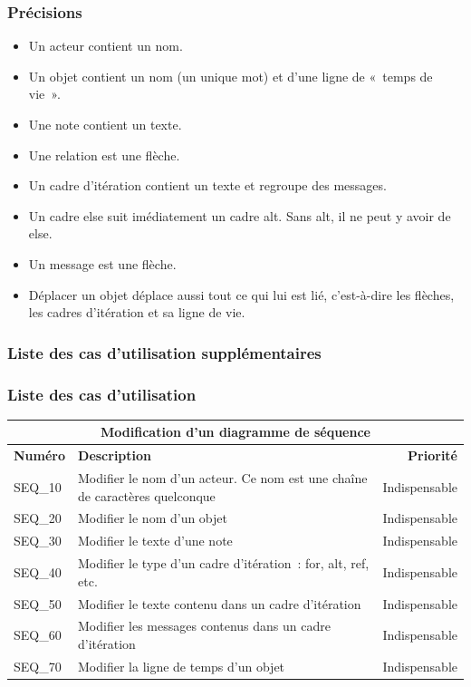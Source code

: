 \documentclass[hidelinks, 10pt,a4paper]{article}
\begin{document}
\subsubsection{Précisions}
\begin{itemize}
 \item Un acteur contient un nom.
 \item Un objet contient un nom (un unique mot) et d’une ligne de «~temps de vie~».
 \item Une note contient un texte.
 \item Une relation est une flèche.
 \item Un cadre d’itération contient un texte et regroupe des messages.
 \item Un cadre else suit imédiatement un cadre alt. Sans alt, il ne peut y avoir de else.
 \item Un message est une flèche.
 \item Déplacer un objet déplace aussi tout ce qui lui est lié, c’est-à-dire les flèches, les cadres d’itération et sa ligne de vie.
\end{itemize}

\subsubsection{Liste des cas d’utilisation supplémentaires}
\subsubsection{Liste des cas d’utilisation}
\begin{center}
    \begin{tabular}{|l|p{8cm}|r|}
        \hline\multicolumn{3}{|c|}{Modification d’un diagramme de séquence} \\\hline
        {\textbf{Numéro}} & {\textbf{Description}} & {\textbf{Priorité}}\\\hline
        {SEQ\_10} & {Modifier le nom d’un acteur. Ce nom est une chaîne de caractères quelconque} & {Indispensable}\\\hline
        {SEQ\_20} & {Modifier le nom d’un objet} & {Indispensable}\\\hline
        {SEQ\_30} & {Modifier le texte d’une note} & {Indispensable}\\\hline
        {SEQ\_40} & {Modifier le type d’un cadre d’itération~: for, alt, ref, etc.} & {Indispensable}\\\hline
        {SEQ\_50} & {Modifier le texte contenu dans un cadre d’itération} & {Indispensable}\\\hline
        {SEQ\_60} & {Modifier les messages contenus dans un cadre d’itération} & {Indispensable}\\\hline
	{SEQ\_70} & {Modifier la ligne de temps d’un objet} & {Indispensable}\\\hline
    \end{tabular}
\end{center}
\end{document}
